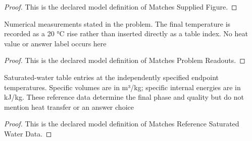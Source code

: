 \begin{proof}
  This is the declared model definition of Matches Supplied Figure.
\end{proof}
\begin{definition}
  \label{def:physics:phyx-mini-0451:phyxminiproblems-problemphyxmini0451-matchesproblemreadouts}
  Numerical measurements stated in the problem. The final temperature is recorded as a 20 °C rise rather than inserted directly as a table index. No heat value or answer label occurs here
\end{definition}
\begin{proof}
  This is the declared model definition of Matches Problem Readouts.
\end{proof}
\begin{definition}
  \label{def:physics:phyx-mini-0451:phyxminiproblems-problemphyxmini0451-matchesreferencesaturatedwaterdata}
  Saturated-water table entries at the independently specified endpoint temperatures. Specific volumes are in m³/kg; specific internal energies are in kJ/kg. These reference data determine the final phase and quality but do not mention heat transfer or an answer choice
\end{definition}
\begin{proof}
  This is the declared model definition of Matches Reference Saturated Water Data.
\end{proof}
